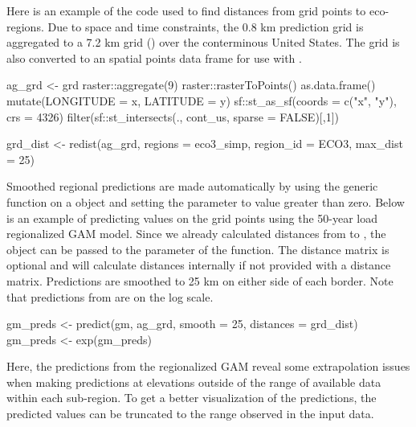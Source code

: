 Here is an example of the code used to find distances from grid points to eco-regions. Due to space and time constraints, the 0.8 km prediction grid is aggregated to a 7.2 km grid () over the conterminous United States. The grid is also converted to an  spatial points data frame for use with .

\begin{example}
ag_grd <- grd %
  raster::aggregate(9) %
  raster::rasterToPoints() %
  as.data.frame() %
  mutate(LONGITUDE = x, LATITUDE = y) %
  sf::st_as_sf(coords = c("x", "y"), crs = 4326) %
  filter(sf::st_intersects(., cont_us, sparse = FALSE)[,1])

grd_dist <- redist(ag_grd, regions = eco3_simp, region_id = ECO3, max_dist = 25)
\end{example}

Smoothed regional predictions are made automatically by using the generic  function on a  object and setting the  parameter to value greater than zero. Below is an example of predicting values on the grid points using the 50-year load regionalized GAM model. Since we already calculated distances from  to , the  object can be passed to the  parameter of the  function. The distance matrix is optional and  will calculate distances internally if not provided with a distance matrix. Predictions are smoothed to 25 km on either side of each border. Note that predictions from  are on the log scale.

\begin{example}
gm_preds <- predict(gm, ag_grd, smooth = 25, distances = grd_dist)
gm_preds <- exp(gm_preds)
\end{example}

Here, the predictions from the regionalized GAM reveal some extrapolation issues when making predictions at elevations outside of the range of available data within each sub-region. To get a better visualization of the predictions, the predicted values can be truncated to the range observed in the input data. 


